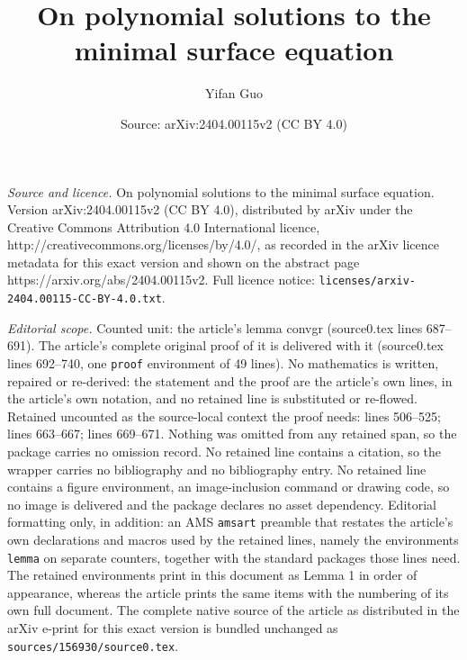 \documentclass[10pt,a4paper]{amsart}
\title{On polynomial solutions to the minimal surface equation}
\author{Yifan Guo}
\date{Source: arXiv:2404.00115v2 (CC BY 4.0)}
\begin{document}
\maketitle

\noindent\emph{Source and licence.} On polynomial solutions to the minimal surface equation. Version arXiv:2404.00115v2 (CC BY 4.0), distributed by arXiv under the Creative Commons Attribution 4.0 International licence, http://creativecommons.org/licenses/by/4.0/, as recorded in the arXiv licence metadata for this exact version and shown on the abstract page https://arxiv.org/abs/2404.00115v2. Full licence notice: \texttt{licenses/arxiv-2404.00115-CC-BY-4.0.txt}.\par\smallskip

\noindent\textit{Editorial scope.} Counted unit: the article's lemma convgr (source0.tex lines 687--691). The article's complete original proof of it is delivered with it (source0.tex lines 692--740, one \texttt{proof} environment of 49 lines). No mathematics is written, repaired or re-derived: the statement and the proof are the article's own lines, in the article's own notation, and no retained line is substituted or re-flowed.  Retained uncounted as the source-local context the proof needs: lines 506--525; lines 663--667; lines 669--671.  Nothing was omitted from any retained span, so the package carries no omission record.  No retained line contains a citation, so the wrapper carries no bibliography and no bibliography entry.  No retained line contains a figure environment, an image-inclusion command or drawing code, so no image is delivered and the package declares no asset dependency.  Editorial formatting only, in addition: an AMS \texttt{amsart} preamble that restates the article's own declarations and macros used by the retained lines, namely the environments \texttt{lemma} on separate counters, together with the standard packages those lines need.  The retained environments print in this document as Lemma 1 in order of appearance, whereas the article prints the same items with the numbering of its own full document.  The complete native source of the article as distributed in the arXiv e-print for this exact version is bundled unchanged as \texttt{sources/156930/source0.tex}.
\end{document}
